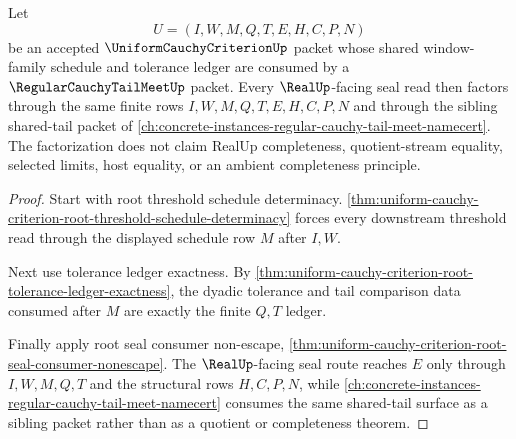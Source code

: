 \begin{theorem}
\label{thm:uniform-cauchy-criterion-root-shared-tail-meet}
Let
$$
U=(I,W,M,Q,T,E,H,C,P,N)
$$
be an accepted $\UniformCauchyCriterionUp$ packet whose shared window-family schedule and tolerance ledger are consumed by a $\RegularCauchyTailMeetUp$ packet. Every $\RealUp$-facing seal read then factors through the same finite rows $I,W,M,Q,T,E,H,C,P,N$ and through the sibling shared-tail packet of \autoref{ch:concrete-instances-regular-cauchy-tail-meet-namecert}. The factorization does not claim RealUp completeness, quotient-stream equality, selected limits, host equality, or an ambient completeness principle.
\end{theorem}
\begin{proof}
Start with root threshold schedule determinacy. \autoref{thm:uniform-cauchy-criterion-root-threshold-schedule-determinacy} forces every downstream threshold read through the displayed schedule row $M$ after $I,W$.

Next use tolerance ledger exactness. By \autoref{thm:uniform-cauchy-criterion-root-tolerance-ledger-exactness}, the dyadic tolerance and tail comparison data consumed after $M$ are exactly the finite $Q,T$ ledger.

Finally apply root seal consumer non-escape, \autoref{thm:uniform-cauchy-criterion-root-seal-consumer-nonescape}. The $\RealUp$-facing seal route reaches $E$ only through $I,W,M,Q,T$ and the structural rows $H,C,P,N$, while \autoref{ch:concrete-instances-regular-cauchy-tail-meet-namecert} consumes the same shared-tail surface as a sibling packet rather than as a quotient or completeness theorem.
\end{proof}

